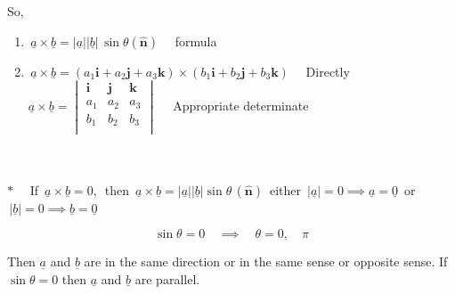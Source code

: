 \documentclass[11pt,a4paper]{article}
\theoremstyle{definition}
\begin{document}
So,
\begin{enumerate}
\item $\,\underline{a} \times \underline{b} = |\underline{a}||\underline{b}|\,\sin \theta \left(\hat{\textbf{n}}\right)\quad $ formula\\

\item $\,\underline{a} \times \underline{b} = \left( a_1 \textbf{i} + a_2\textbf{j} + a_3\textbf{k}\right)\times \left(b_1 \textbf{i} + b_2\textbf{j} + b_3\textbf{k}\right)\quad $ Directly\\



$\underline{a}\times \underline{b}  = \begin{vmatrix}
\textbf{i} & \textbf{j} & \textbf{k}\\
a_1 & a_2 & a_3\\
b_1 & b_2 & b_3\\
\end{vmatrix}\quad  $ Appropriate determinate\\\\\
\end{enumerate}













$*\quad $ If $\,\underline{a}\times \underline{b} = 0,\,$ then $\,\underline{a}\times \underline{b} = \left|\underline{a}\right| \left|\underline{b}\right|\sin \theta\,(\hat{\textbf{n}})\,$ either $\, \left|\underline{a}\right| = 0 \implies \underline{a}= \underline{0}\,$ or $\, \left|\underline{b}\right| = 0\implies \underline{b} = \underline{0}$

$$\sin \theta = 0 \quad  \implies \quad  \theta = 0, \quad  \pi$$

Then $\underline{a}$ and $\underline{b}$ are in the same direction or in the same sense or opposite sense. If $\sin \theta = 0$ then $\underline{a}$ and $\underline{b}$ are parallel.\\\\\\
\end{document}
